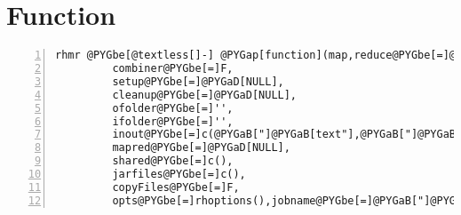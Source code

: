 \documentclass[letterpaper,10pt,english]{manual}
\begin{document}
\section{Function}

\begin{Verbatim}[commandchars=@\[\],numbers=left,firstnumber=1,stepnumber=1]
rhmr @PYGbe[@textless[]-] @PYGap[function](map,reduce@PYGbe[=]@PYGaD[NULL],
         combiner@PYGbe[=]F,
         setup@PYGbe[=]@PYGaD[NULL],
         cleanup@PYGbe[=]@PYGaD[NULL],
         ofolder@PYGbe[=]'',
         ifolder@PYGbe[=]'',
         inout@PYGbe[=]c(@PYGaB["]@PYGaB[text"],@PYGaB["]@PYGaB[text"]),
         mapred@PYGbe[=]@PYGaD[NULL],
         shared@PYGbe[=]c(),
         jarfiles@PYGbe[=]c(),
         copyFiles@PYGbe[=]F,
         opts@PYGbe[=]rhoptions(),jobname@PYGbe[=]@PYGaB["]@PYGaB["])
\end{Verbatim}
\end{document}
